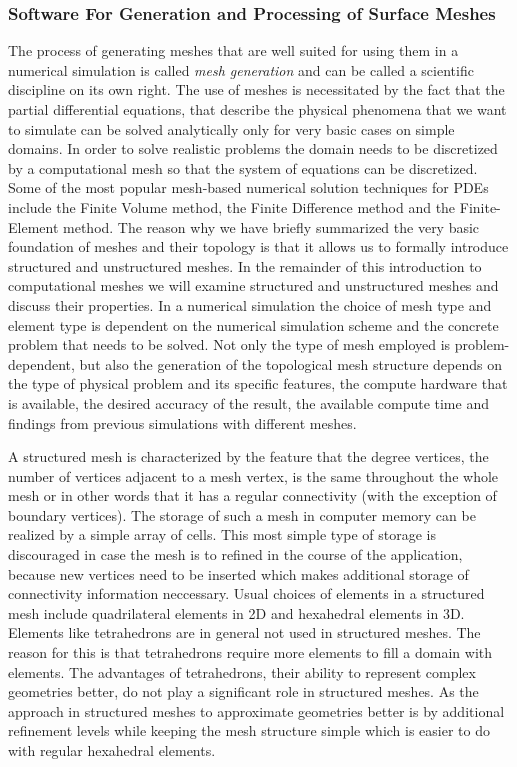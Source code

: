 \begin{frame}
\frametitle{Software For Generation and Processing of Surface Meshes}
The process of generating meshes that are well suited for using them in a numerical simulation is 
called \textit{mesh generation} and can be called a scientific discipline on its own right. The use of meshes is necessitated by the fact that the partial differential equations,
that describe the physical phenomena that we want to simulate can be solved analytically only for very basic cases on simple domains. In order to solve realistic
problems the domain needs to be discretized by a computational mesh so that the system of equations can be discretized. Some of the most popular mesh-based numerical 
solution techniques for PDEs include the Finite Volume method, the Finite Difference method and the Finite-Element method. The reason why we have briefly summarized 
the very basic foundation of meshes and their topology is that it allows us to formally introduce structured and unstructured meshes. In the remainder of this 
introduction to computational meshes we will examine structured and unstructured meshes and discuss their properties. In a numerical simulation the choice of mesh 
type and element type is dependent on the numerical simulation scheme and the concrete problem that needs to be solved. Not only the type of mesh employed is problem-dependent,
but also the generation of the topological mesh structure depends on the type of physical problem and its specific features, the compute hardware that is 
available, the desired accuracy of the result, the available compute time 
and findings from previous simulations with different meshes.
\end{frame}

\begin{frame}
A structured mesh is characterized by the feature that the degree vertices, the number of vertices adjacent to a mesh vertex, is the same throughout the
whole mesh or in other words that it has a regular connectivity (with the exception of boundary vertices). The storage of such a mesh in computer memory can be realized by a simple array 
of cells. This most simple
type of storage is discouraged in case the mesh is to refined in the course of the application, because new vertices need to be inserted which makes additional
storage of connectivity information neccessary. Usual choices of elements in a structured mesh include quadrilateral elements in 2D and hexahedral elements in 3D. 
Elements like tetrahedrons are in general not used in structured meshes. The reason for this is that tetrahedrons require more elements to fill a domain with elements.
The advantages of tetrahedrons, their ability to represent complex geometries better, do not play a significant role in structured meshes. As the 
approach in structured meshes to approximate geometries better is by additional refinement levels while keeping the mesh structure simple which is easier to do
with regular hexahedral elements. 
\end{frame}


